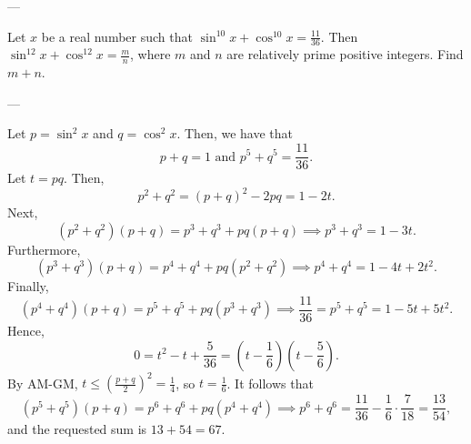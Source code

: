 
---

Let $x$ be a real number such that $\sin^{10}x+\cos^{10}x=\tfrac{11}{36}$. Then $\sin^{12}x+\cos^{12}x=\tfrac mn$, where $m$ and $n$ are relatively prime positive integers. Find $m+n$.

---

Let $p=\sin^2 x$ and $q=\cos^2 x$. Then, we have that \[p+q=1\text{ and }p^5+q^5=\frac{11}{36}.\]
Let $t=pq$. Then, \[p^2+q^2=(p+q)^2-2pq=1-2t.\]
Next, \[(p^2+q^2)(p+q)=p^3+q^3+pq(p+q)\implies p^3+q^3=1-3t.\]
Furthermore, \[(p^3+q^3)(p+q)=p^4+q^4+pq(p^2+q^2)\implies p^4+q^4=1-4t+2t^2.\]
Finally, \[(p^4+q^4)(p+q)=p^5+q^5+pq(p^3+q^3)\implies \frac{11}{36}=p^5+q^5=1-5t+5t^2.\]
Hence, \[0=t^2-t+\frac{5}{36}=\left(t-\frac16\right)\left(t-\frac56\right).\]
By AM-GM, $t\le (\tfrac{p+q}2)^2=\tfrac 14$, so $t=\tfrac 16$. It follows that \[(p^5+q^5)(p+q)=p^6+q^6+pq(p^4+q^4)\implies p^6+q^6=\frac{11}{36}-\frac16\cdot\frac7{18}=\frac{13}{54},\]
and the requested sum is $13+54=67$.

